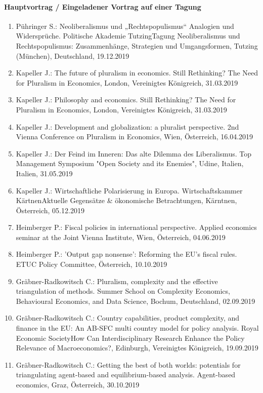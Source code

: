 \paragraph{Hauptvortrag / Eingeladener Vortrag auf einer Tagung}
\begin{enumerate}
	\item Pühringer S.: Neoliberalismus und „Rechtspopulismus“ Analogien und Widersprüche. Politische Akademie TutzingTagung Neoliberalismus und Rechtspopulismus: Zusammenhänge, Strategien und Umgangsformen, Tutzing (München), Deutschland, 19.12.2019
	\item Kapeller J.: The future of pluralism in economics. Still Rethinking? The Need for Pluralism in Economics, London, Vereinigtes Königreich, 31.03.2019
	\item Kapeller J.: Philosophy and economics. Still Rethinking? The Need for Pluralism in Economics, London, Vereinigtes Königreich, 31.03.2019
	\item Kapeller J.: Development and globalization: a pluralist perspective. 2nd Vienna Conference on Pluralism in Economics, Wien, Österreich, 16.04.2019
	\item Kapeller J.: Der Feind im Inneren: Das alte Dilemma des Liberalismus. Top Management Symposium "Open Society and its Enemies", Udine, Italien, Italien, 31.05.2019
	\item Kapeller J.: Wirtschaftliche Polarisierung in Europa. Wirtschaftskammer KärtnenAktuelle Gegensätze & ökonomische Betrachtungen, Kärntnen, Österreich, 05.12.2019
	\item Heimberger P.: Fiscal policies in international perspective. Applied economics seminar at the Joint Vienna Institute, Wien, Österreich, 04.06.2019
	\item Heimberger P.: 'Output gap nonsense': Reforming the EU's fiscal rules. ETUC Policy Committee, Österreich, 10.10.2019
	\item Gräbner-Radkowitsch C.: Pluralism, complexity and the effective triangulation of methods. Summer School on Complexity Economics, Behavioural Economics, and Data Science, Bochum, Deutschland, 02.09.2019
	\item Gräbner-Radkowitsch C.: Country capabilities, product complexity, and finance in the EU: An AB-SFC multi country model for policy analysis. Royal Economic SocietyHow Can Interdisciplinary Research Enhance the Policy Relevance of Macroeconomics?, Edinburgh, Vereinigtes Königreich, 19.09.2019
	\item Gräbner-Radkowitsch C.: Getting the best of both worlds: potentials for triangulating agent-based and equilibrium-based analysis. Agent-based economics, Graz, Österreich, 30.10.2019
\end{enumerate}
